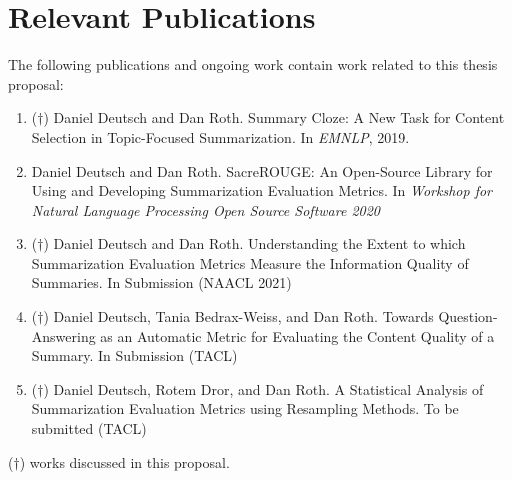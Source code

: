 \documentclass[../main.tex]{subfiles}
\begin{document}
\section*{Relevant Publications}

The following publications and ongoing work contain work related to this thesis proposal:

\begin{enumerate}

\item ($\dagger$) Daniel Deutsch and Dan Roth. Summary Cloze: A New Task for Content Selection in Topic-Focused Summarization. In \emph{EMNLP}, 2019.

\item Daniel Deutsch and Dan Roth. SacreROUGE: An Open-Source Library for Using and Developing Summarization Evaluation Metrics. In \textit{Workshop for Natural Language Processing Open Source Software 2020}

\item ($\dagger$) Daniel Deutsch and Dan Roth. Understanding the Extent to which Summarization Evaluation Metrics Measure the Information Quality of Summaries. In Submission (NAACL 2021)

\item ($\dagger$) Daniel Deutsch, Tania Bedrax-Weiss, and Dan Roth. Towards Question-Answering as an Automatic Metric for Evaluating the Content Quality of a Summary. In Submission (TACL)

\item ($\dagger$) Daniel Deutsch, Rotem Dror, and Dan Roth. A Statistical Analysis of Summarization Evaluation Metrics using Resampling Methods. To be submitted (TACL)

\end{enumerate}

\noindent
($\dagger$) works discussed in this proposal.
\end{document}
